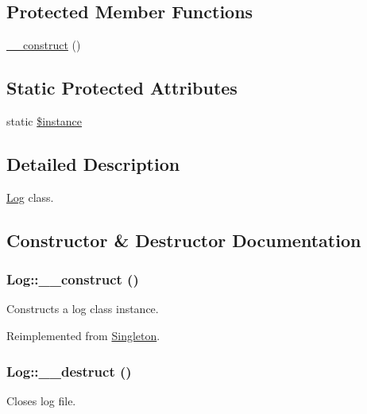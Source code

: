\subsection*{Protected Member Functions}
\begin{DoxyCompactItemize}
\item 
\hyperlink{classLog_ab413a80ef95f69c127319bbfc7cbb9e7}{\_\-\_\-construct} ()
\end{DoxyCompactItemize}
\subsection*{Static Protected Attributes}
\begin{DoxyCompactItemize}
\item 
static \hyperlink{classLog_af469fce19eb78a62dce34d2925348d53}{\$instance}
\end{DoxyCompactItemize}


\subsection{Detailed Description}
\hyperlink{classLog}{Log} class. 

\subsection{Constructor \& Destructor Documentation}
\hypertarget{classLog_ab413a80ef95f69c127319bbfc7cbb9e7}{
\subsubsection[{\_\-\_\-construct}]{\setlength{\rightskip}{0pt plus 5cm}Log::\_\-\_\-construct ()}}
\label{classLog_ab413a80ef95f69c127319bbfc7cbb9e7}
Constructs a log class instance. 

Reimplemented from \hyperlink{classSingleton}{Singleton}.

\hypertarget{classLog_a8a98440f17cf6a9ce14597897e845abf}{
\subsubsection[{\_\-\_\-destruct}]{\setlength{\rightskip}{0pt plus 5cm}Log::\_\-\_\-destruct ()}}
\label{classLog_a8a98440f17cf6a9ce14597897e845abf}
Closes log file. 

